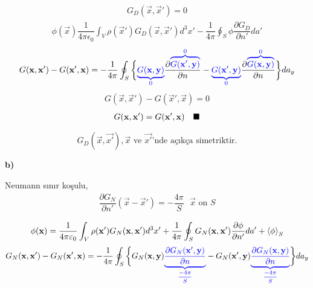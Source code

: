 \begin{align*}
G_{D} (\Vec{x}, \vec{x}') = 0
\end{align*}
\begin{align*}
\phi (\Vec{x}) \dfrac{1}{4 \pi \epsilon_{0}} \int_{V} \rho (\vec{x}') G_{D} (\Vec{x}, \vec{x}') d^{3} x' - \dfrac{1}{4 \pi} \oint_{S} \phi \dfrac{\partial G_{D}}{\partial n'} da'
\end{align*}
\begin{align*}
G (\Vec{x}, \vec{x}') - G (\vec{x}', \Vec{x} ) = - \dfrac{1}{4 \pi} \oint_{S} \bigg\{ \begingroup \color{blue}{\underbrace{G ( \Vec{x} , \Vec{y}  )}_\text{0}} \endgroup \dfrac{\partial \begingroup \color{blue}{\overbrace{ G (\vec{x}', \Vec{y} )}^\text{0}} \endgroup}{\partial n} -  \begingroup \color{blue}{\underbrace{ G ( \vec{x}', \Vec{y} )}_\text{0}} \endgroup  \dfrac{\partial \begingroup \color{blue}{\overbrace{G ( \Vec{x}, \Vec{y} )}^\text{0}} \endgroup }{\partial n} \bigg\} da_{y} 
\end{align*} 
\begin{align*}
G (\Vec{x}, \vec{x}') - G (\vec{x}', \Vec{x} ) = 0
\end{align*} 
\begin{align*}
G (\Vec{x}, \vec{x}')  = G (\vec{x}', \Vec{x} ) \qed
\end{align*} 
\begin{tcolorbox}
\[
    G_{D}(\Vec{x}, \Vec{x'}), \Vec{x} \textrm{ ve } \Vec{x'}\textrm{'nde açıkça simetriktir.}
\]
\end{tcolorbox}
\textbf{b)}
\begin{tcolorbox}
Neumann sınır koşulu,
\begin{align*}
    \dfrac{\partial G_{N}}{\partial n'} (\Vec{x} - \vec{x}') = - \dfrac{4 \pi}{S} \textrm{  $\Vec{x}$ on $S$}
\end{align*}
\end{tcolorbox}
\begin{align*}
  \phi ( \Vec{x}) =  \dfrac{1}{4 \pi \epsilon_{0}} \int_{V} \rho ( \vec{x}' )  G_{N}( \Vec{x} ,\vec{x}' ) d^{3} x' + \dfrac{1}{4 \pi} \oint_{S}  G_{N}( \Vec{x} ,\vec{x}' ) \dfrac{\partial \phi}{\partial n'}  da' + \mean{\phi}_{S}
\end{align*}
\begin{align*}
G_{N} (\Vec{x}, \vec{x}') - G_{N} (\vec{x}', \Vec{x} ) = - \dfrac{1}{4 \pi} \oint_{S} \bigg\{ G_{N} ( \Vec{x} , \Vec{y}) \begingroup \color{blue}{\underbrace{\dfrac{\partial G_{N} (\vec{x}', \Vec{y} )}{\partial n}}_\text{$\dfrac{-4\pi}{S}$} } \endgroup  - G_{N} ( \vec{x}', \Vec{y} )\begingroup \color{blue}{\underbrace{\dfrac{\partial G_{N} (\vec{x}, \Vec{y} )}{\partial n}}_\text{$\dfrac{-4\pi}{S}$} } \endgroup \bigg\} da_{y} 
\end{align*}
